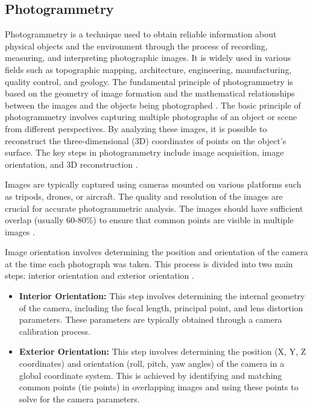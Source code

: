 \documentclass[12pt,a4paper,oneside]{report}
\begin{document}
\subsection{Photogrammetry}

Photogrammetry is a technique used to obtain reliable information about physical 
objects and the environment through the process of recording, measuring, and interpreting 
photographic images. It is widely used in various fields such as topographic mapping, 
architecture, engineering, manufacturing, quality control, and geology. The fundamental 
principle of photogrammetry is based on the geometry of image formation and the 
mathematical relationships between the images and the objects being photographed
\cite{hartleyMultipleViewGeometry2003,krausPhotogrammetryGeometryImages2007}.
The basic principle of photogrammetry involves capturing multiple photographs of 
an object or scene from different perspectives. By analyzing these images, it is 
possible to reconstruct the three-dimensional (3D) coordinates of points on the 
object's surface. The key steps in photogrammetry include image acquisition, image 
orientation, and 3D reconstruction
\cite{hartleyMultipleViewGeometry2003,szeliskiComputerVisionAlgorithms2022}.

Images are typically captured using cameras mounted on various platforms such as 
tripods, drones, or aircraft. The quality and resolution of the images are crucial 
for accurate photogrammetric analysis. The images should have sufficient overlap 
(usually 60-80\%) to ensure that common points are visible in multiple images
\cite{colominaUnmannedAerialSystems2014,nexUAV3DMapping2014}.

Image orientation involves determining the position and orientation of the camera 
at the time each photograph was taken. This process is divided into two main steps: 
interior orientation and exterior orientation 
\cite{brownCloseRangeCameraCalibration2002,triggsBundleAdjustmentModern2000}.

\begin{itemize}
    \item \textbf{Interior Orientation:} This step involves determining the internal 
    geometry of the camera, including the focal length, principal point, and lens 
    distortion parameters. These parameters are typically obtained through a camera 
    calibration process.
    \item \textbf{Exterior Orientation:} This step involves determining the position 
    (X, Y, Z coordinates) and orientation (roll, pitch, yaw angles) of the camera 
    in a global coordinate system. This is achieved by identifying and matching 
    common points (tie points) in overlapping images and using these points to solve 
    for the camera parameters.
\end{itemize}
\end{document}
